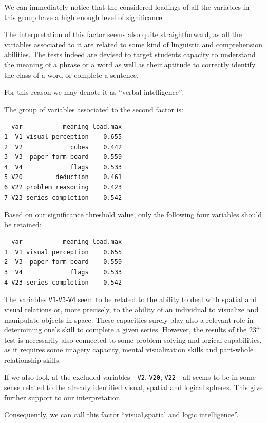 \documentclass[
  letterpaper,
  DIV=11,
  numbers=noendperiod]{scrartcl}
\begin{document}
We can immediately notice that the considered loadings of all the
variables in this group have a high enough level of significance.

The interpretation of this factor seems also quite straightforward, as
all the variables associated to it are related to some kind of
linguistic and comprehension abilities. The tests indeed are devised to
target students capacity to understand the meaning of a phrase or a word
as well as their aptitude to correctly identify the class of a word or
complete a sentence.

For this reason we may denote it as ``verbal intelligence''.

The group of variables associated to the second factor is:

\begin{verbatim}
  var           meaning load.max
1  V1 visual perception    0.655
2  V2             cubes    0.442
3  V3  paper form board    0.559
4  V4             flags    0.533
5 V20         deduction    0.461
6 V22 problem reasoning    0.423
7 V23 series completion    0.542
\end{verbatim}

Based on our significance threshold value, only the following four
variables should be retained:

\begin{verbatim}
  var           meaning load.max
1  V1 visual perception    0.655
2  V3  paper form board    0.559
3  V4             flags    0.533
4 V23 series completion    0.542
\end{verbatim}

The variables \texttt{V1}-\texttt{V3}-\texttt{V4} seem to be related to
the ability to deal with spatial and visual relations or, more
precisely, to the ability of an individual to visualize and manipulate
objects in space. These capacities surely play also a relevant role in
determining one's skill to complete a given series. However, the results
of the \(23^{th}\) test is necessarily also connected to some
problem-solving and logical capabilities, as it requires some imagery
capacity, mental visualization skills and part-whole relationship
skills.

If we also look at the excluded variables - \texttt{V2}, \texttt{V20},
\texttt{V22} - all seems to be in some sense related to the already
identified visual, spatial and logical spheres. This give further
support to our interpretation.

Consequently, we can call this factor ``visual,spatial and logic
intelligence''.
\end{document}
